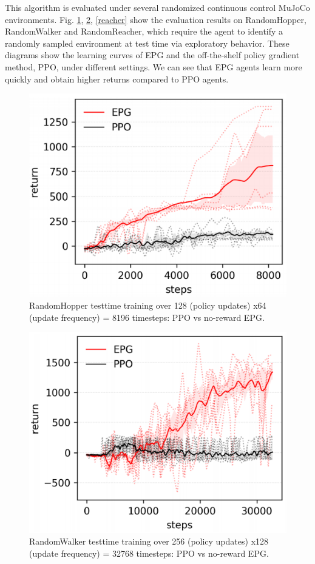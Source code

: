 \par
This algorithm is evaluated under several randomized continuous control MuJoCo environments. Fig. \ref{hopper}, \ref{walker}, \ref{reacher} show the evaluation results on RandomHopper, RandomWalker and RandomReacher, which require the agent to identify a randomly sampled environment at test time via exploratory behavior. These diagrams show the learning curves of EPG and the off-the-shelf policy gradient method, PPO, under different settings. We can see that EPG agents learn more quickly and obtain higher returns compared to PPO agents.

\begin{figure}
	\includegraphics[scale=0.6]{hopper.png}
	\centering
	\caption{RandomHopper testtime training over 128 (policy updates) x64 (update frequency) = 8196 timesteps: PPO vs no-reward EPG.}
	\label{hopper}
\end{figure}
\begin{figure}
	\includegraphics[scale=0.6]{walker.png}
	\centering
	\caption{RandomWalker testtime training over 256 (policy updates) x128 (update frequency) = 32768 timesteps: PPO vs no-reward EPG.}
	\label{walker}
\end{figure}
